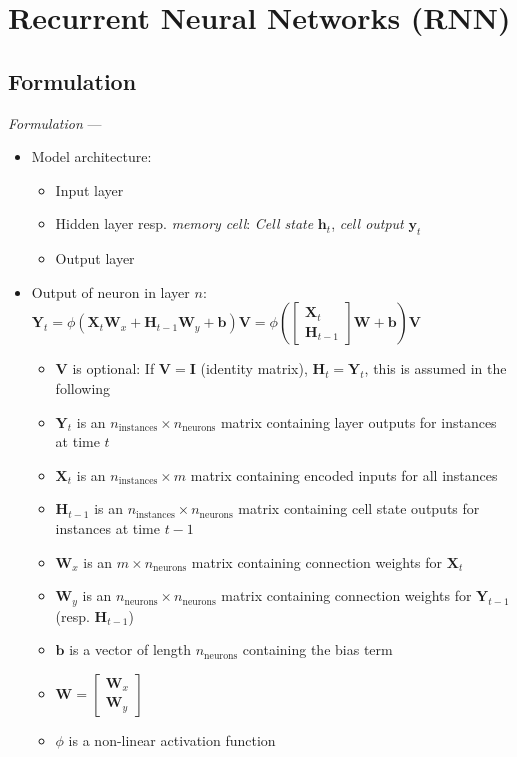 \section{Recurrent Neural Networks (RNN)}
\subsection*{Formulation}
\emph{Formulation} --- 
\begin{itemize}
    \item Model architecture: 
    \begin{itemize}
        \item Input layer
        \item Hidden layer resp. \emph{memory cell}: \emph{Cell state} $\boldsymbol{h}_t$, \emph{cell output} $\boldsymbol{y}_t$
        \item Output layer
    \end{itemize}
    \item Output of neuron in layer $n$: \\
    $
    \boldsymbol{Y}_{t} = \phi \left( \boldsymbol{X}_{t} \boldsymbol{W}_{x} + \boldsymbol{H}_{t-1} \boldsymbol{W}_{y} + \boldsymbol{b} \right) \boldsymbol{V}
    = \phi \left( \begin{bmatrix} \boldsymbol{X}_{t} \\ \boldsymbol{H}_{t-1} \end{bmatrix} \boldsymbol{W} + \boldsymbol{b} \right) \boldsymbol{V}
    $
    \begin{itemize}
        \item $\boldsymbol{V}$ is optional: If $\boldsymbol{V} = \boldsymbol{I}$ (identity matrix), $\boldsymbol{H}_{t} = \boldsymbol{Y}_{t}$, this is assumed in the following
        \item $\boldsymbol{Y}_{t}$ is an $n_{\text{instances}} \times n_{\text{neurons}}$ matrix containing layer outputs for instances at time $t$
        \item $\boldsymbol{X}_{t}$ is an $n_{\text{instances}} \times m$ matrix containing encoded inputs for all instances
        \item $\boldsymbol{H}_{t-1}$ is an $n_{\text{instances}} \times n_{\text{neurons}}$ matrix containing cell state outputs for instances at time $t-1$
        \item $\boldsymbol{W}_{x}$ is an $m \times n_{\text{neurons}}$ matrix containing connection weights for $\boldsymbol{X}_{t}$
        \item $\boldsymbol{W}_{y}$ is an $n_{\text{neurons}} \times n_{\text{neurons}}$ matrix containing connection weights for $\boldsymbol{Y}_{t-1}$ (resp. $\boldsymbol{H}_{t-1}$)
        \item $\boldsymbol{b}$ is a vector of length $n_{\text{neurons}}$ containing the bias term
        \item $\boldsymbol{W} = \begin{bmatrix} \boldsymbol{W}_{x} \\ \boldsymbol{W}_{y} \end{bmatrix}$
        \item $\phi$ is a non-linear activation function
    \end{itemize}
\end{itemize}

